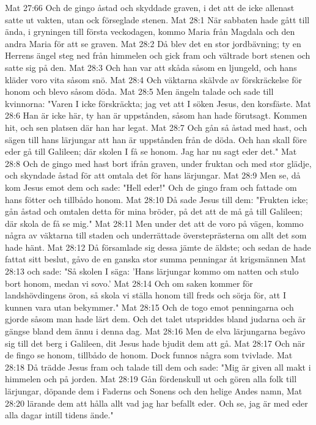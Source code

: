 Mat 27:66  Och de gingo åstad och skyddade graven, i det att de icke allenast satte ut vakten, utan ock förseglade stenen.
Mat 28:1  När sabbaten hade gått till ända, i gryningen till första veckodagen, kommo Maria från Magdala och den andra Maria för att se graven.
Mat 28:2  Då blev det en stor jordbävning; ty en Herrens ängel steg ned från himmelen och gick fram och vältrade bort stenen och satte sig på den.
Mat 28:3  Och han var att skåda såsom en ljungeld, och hans kläder voro vita såsom snö.
Mat 28:4  Och väktarna skälvde av förskräckelse för honom och blevo såsom döda.
Mat 28:5  Men ängeln talade och sade till kvinnorna: "Varen I icke förskräckta; jag vet att I söken Jesus, den korsfäste.
Mat 28:6  Han är icke här, ty han är uppstånden, såsom han hade förutsagt. Kommen hit, och sen platsen där han har legat.
Mat 28:7  Och gån så åstad med hast, och sägen till hans lärjungar att han är uppstånden från de döda. Och han skall före eder gå till Galileen; där skolen I få se honom. Jag har nu sagt eder det."
Mat 28:8  Och de gingo med hast bort ifrån graven, under fruktan och med stor glädje, och skyndade åstad för att omtala det för hans lärjungar.
Mat 28:9  Men se, då kom Jesus emot dem och sade: "Hell eder!" Och de gingo fram och fattade om hans fötter och tillbådo honom.
Mat 28:10  Då sade Jesus till dem: "Frukten icke; gån åstad och omtalen detta för mina bröder, på det att de må gå till Galileen; där skola de få se mig."
Mat 28:11  Men under det att de voro på vägen, kommo några av väktarna till staden och underrättade översteprästerna om allt det som hade hänt.
Mat 28:12  Då församlade sig dessa jämte de äldste; och sedan de hade fattat sitt beslut, gåvo de en ganska stor summa penningar åt krigsmännen
Mat 28:13  och sade: "Så skolen I säga: 'Hans lärjungar kommo om natten och stulo bort honom, medan vi sovo.'
Mat 28:14  Och om saken kommer för landshövdingens öron, så skola vi ställa honom till freds och sörja för, att I kunnen vara utan bekymmer."
Mat 28:15  Och de togo emot penningarna och gjorde såsom man hade lärt dem. Och det talet utspriddes bland judarna och är gängse bland dem ännu i denna dag.
Mat 28:16  Men de elva lärjungarna begåvo sig till det berg i Galileen, dit Jesus hade bjudit dem att gå.
Mat 28:17  Och när de fingo se honom, tillbådo de honom. Dock funnos några som tvivlade.
Mat 28:18  Då trädde Jesus fram och talade till dem och sade: "Mig är given all makt i himmelen och på jorden.
Mat 28:19  Gån fördenskull ut och gören alla folk till lärjungar, döpande dem i Faderns och Sonens och den helige Andes namn,
Mat 28:20  lärande dem att hålla allt vad jag har befallt eder. Och se, jag är med eder alla dagar intill tidens ände."


